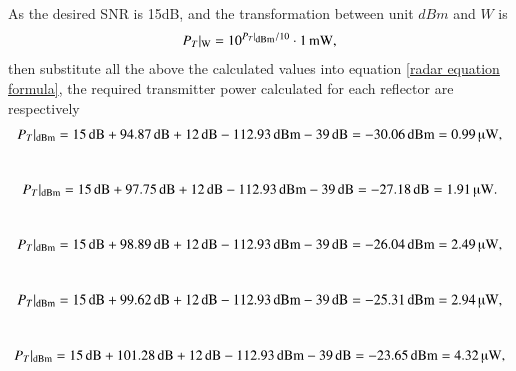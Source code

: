 \documentclass[12pt,DIV14,BCOR12mm,a4paper,footinclude=false,headinclude,parskip=half-,twoside,openright,cleardoublepage=empty,toc=index,bibliography=totoc,listof=totoc]{scrreprt}
\numberwithin{equation}{chapter}
\begin{document}
As the desired SNR is 15dB, and the transformation between unit $dBm$ and $W$ is
\begin{equation}
    \centering
    P_{T} \vert \textsubscript{W} = 10^{{P_{T} \vert \textsubscript{dBm}} / 10} \cdot 1\,\mathrm{mW},
\end{equation}
then substitute all the above the calculated values into equation \ref{radar equation formula}, the required transmitter power calculated for each reflector are respectively
\begin{equation}
    \centering
    P_{T} \vert \textsubscript{dBm} = 15\,\mathrm{dB} + 94.87\,\mathrm{dB} + 12\,\mathrm{dB} - 112.93\,\mathrm{dBm} - 39\,\mathrm{dB} = -30.06\,\mathrm{dBm} = 0.99\,\text{\textmu W},
\end{equation}\\
\begin{equation}
    \centering
    P_{T} \vert \textsubscript{dBm} = 15\,\mathrm{dB} + 97.75\,\mathrm{dB} + 12\,\mathrm{dB} - 112.93\,\mathrm{dBm} - 39\,\mathrm{dB} = -27.18\,\mathrm{dB} = 1.91\,\text{\textmu W}.
\end{equation}\\
\begin{equation}
    \centering
    P_{T} \vert \textsubscript{dBm} = 15\,\mathrm{dB} + 98.89\,\mathrm{dB} + 12\,\mathrm{dB} - 112.93\,\mathrm{dBm} - 39\,\mathrm{dB} = -26.04\,\mathrm{dBm} = 2.49\,\text{\textmu W},
\end{equation}\\
\begin{equation}
    \centering
    P_{T} \vert \textsubscript{dBm} = 15\,\mathrm{dB} + 99.62\,\mathrm{dB} + 12\,\mathrm{dB} - 112.93\,\mathrm{dBm} - 39\,\mathrm{dB} = -25.31\,\mathrm{dBm} = 2.94\,\text{\textmu W},
\end{equation}\\
\begin{equation}
    \centering
    P_{T} \vert \textsubscript{dBm} = 15\,\mathrm{dB} + 101.28\,\mathrm{dB} + 12\,\mathrm{dB} - 112.93\,\mathrm{dBm} - 39\,\mathrm{dB} = -23.65\,\mathrm{dBm} = 4.32\,\text{\textmu W},
\end{equation}
\end{document}

